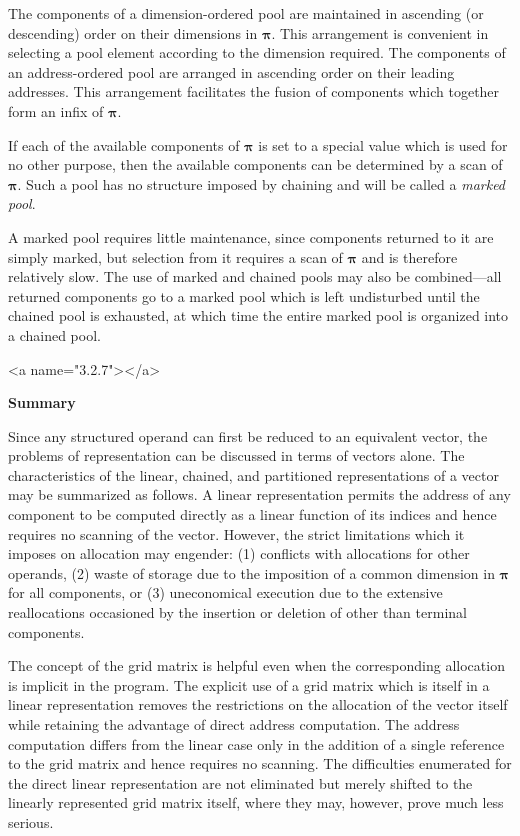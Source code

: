 {\par The components of a dimension-ordered pool are maintained in ascending (or descending) order on their dimensions in $\mathbf{π}$. This arrangement is convenient in selecting a pool element according to the dimension required. The components of an address-ordered pool are arranged in ascending order on their leading addresses. This arrangement facilitates the fusion of components which together form an infix of $\mathbf{π}$.

\par If each of the available components of $\mathbf{π}$ is set to a special value which is used for no other purpose, then the available components can be determined by a scan of $\mathbf{π}$. Such a pool has no structure imposed by chaining and will be called a \textit{marked pool}.

\par A marked pool requires little maintenance, since components returned to it are simply marked, but selection from it requires a scan of $\mathbf{π}$ and is therefore relatively slow. The use of marked and chained pools may also be combined---all returned components go to a marked pool which is left undisturbed until the chained pool is exhausted, at which time the entire marked pool is organized into a chained pool.

<a name="3.2.7"></a>
\par \textbf{Summary}

\par Since any structured operand can first be reduced to an equivalent vector, the problems of representation can be discussed in terms of vectors alone. The characteristics of the linear, chained, and partitioned representations of a vector may be summarized as follows. A linear representation permits the address of any component to be computed directly as a linear function of its indices and hence requires no scanning of the vector. However, the strict limitations which it imposes on allocation may engender: (1) conflicts with allocations for other operands, (2) waste of storage due to the imposition of a common dimension in $\mathbf{π}$ for all components, or (3) uneconomical execution due to the extensive reallocations occasioned by the insertion or deletion of other than terminal components.

\par The concept of the grid matrix is helpful even when the corresponding allocation is implicit in the program. The explicit use of a grid matrix which is itself in a linear representation removes the restrictions on the allocation of the vector itself while retaining the advantage of direct address computation. The address computation differs from the linear case only in the addition of a single reference to the grid matrix and hence requires no scanning. The difficulties enumerated for the direct linear representation are not eliminated but merely shifted to the linearly represented grid matrix itself, where they may, however, prove much less serious.

}
